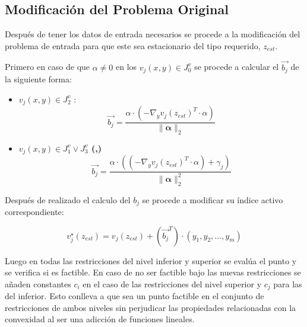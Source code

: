 \subsection*{Modificación del Problema Original}
Después de tener los datos de entrada necesarios se procede a la modificación
del problema de entrada para que este sea estacionario del tipo requerido, $z_{est}$.

\begin{samepage}
Primero en caso de que $\alpha \neq 0$ en los $v_j(x,y) \in J_0^v$ se procede a calcular el $\vec{b_j}$ de la siguiente forma:

\begin{itemize}
    \item \textbf{ $v_j(x,y) \in J_2^v$ }:
        \begin{equation}
            \vec{b_j}=  \frac{{\alpha} \cdot (-\nabla_{y}{v_j(z_{est})}^T \cdot \alpha)}{\|\mathbf{\alpha} \|_2}
        \end{equation}
    \item \textbf{$v_j(x,y) \in J_1^v \lor J_3^v$ (,)}\\
    \begin{equation}
        \vec{b_j}=  \frac{{\alpha} \cdot ((-\nabla_{y}{v_j(z_{est})}^T \cdot \alpha)+\gamma_j)}{\|\mathbf{\alpha} \|_2^2}
    \end{equation}
\end{itemize}


Después de realizado el calculo del $b_j$ se procede a modificar su índice activo correspondiente:

\begin{equation}
	v_{j}^{\star}(z_{est})=v_{j}(z_{est})+ ({\vec{b_j}}^T)\cdot (y_1,y_2,\dots,y_m)
\end{equation}
\end{samepage}

Luego en todas las restricciones del nivel inferior y superior
se evalúa el punto y se verifica si es factible. En caso de no ser factible 
bajo las nuevas restricciones se añaden constantes $c_i$ en el caso de las restricciones del
nivel superior y $c_j$ para las del inferior. Esto conlleva a que sea un punto factible en el conjunto
de restricciones de ambos niveles sin perjudicar las propiedades relacionadas con la convexidad al ser una adicción
de funciones lineales. 

